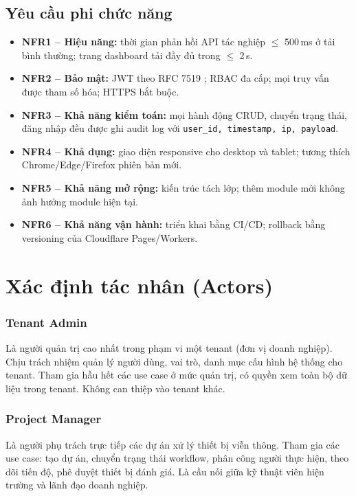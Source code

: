 \subsection{Yêu cầu phi chức năng}
\begin{itemize}[leftmargin=1.2cm]
    \item \textbf{NFR1 -- Hiệu năng:} thời gian phản hồi API tác nghiệp $\leq$ 500\,ms ở tải bình thường; trang dashboard tải đầy đủ trong $\leq$ 2\,s.
    \item \textbf{NFR2 -- Bảo mật:} JWT theo RFC 7519 \cite{rfc7519}; RBAC đa cấp; mọi truy vấn được tham số hóa; HTTPS bắt buộc.
    \item \textbf{NFR3 -- Khả năng kiểm toán:} mọi hành động CRUD, chuyển trạng thái, đăng nhập đều được ghi audit log với \texttt{user\_id, timestamp, ip, payload}.
    \item \textbf{NFR4 -- Khả dụng:} giao diện responsive cho desktop và tablet; tương thích Chrome/Edge/Firefox phiên bản mới.
    \item \textbf{NFR5 -- Khả năng mở rộng:} kiến trúc tách lớp; thêm module mới không ảnh hưởng module hiện tại.
    \item \textbf{NFR6 -- Khả năng vận hành:} triển khai bằng CI/CD; rollback bằng versioning của Cloudflare Pages/Workers.
\end{itemize}

\section{Xác định tác nhân (Actors)}
\label{sec:actors}

\subsubsection*{Tenant Admin}
Là người quản trị cao nhất trong phạm vi một tenant (đơn vị doanh nghiệp). Chịu trách nhiệm quản lý người dùng, vai trò, danh mục cấu hình hệ thống cho tenant. Tham gia hầu hết các use case ở mức quản trị, có quyền xem toàn bộ dữ liệu trong tenant. Không can thiệp vào tenant khác.

\subsubsection*{Project Manager}
Là người phụ trách trực tiếp các dự án xử lý thiết bị viễn thông. Tham gia các use case: tạo dự án, chuyển trạng thái workflow, phân công người thực hiện, theo dõi tiến độ, phê duyệt thiết bị đánh giá. Là cầu nối giữa kỹ thuật viên hiện trường và lãnh đạo doanh nghiệp.

